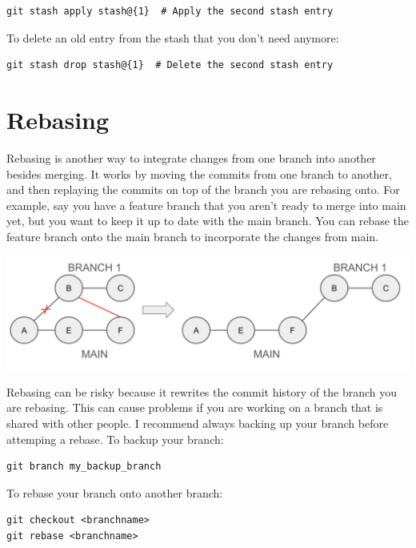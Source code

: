 \documentclass[fleqn]{article}
\begin{document}
\begin{lstlisting}
git stash apply stash@{1}  # Apply the second stash entry
\end{lstlisting}

To delete an old entry from the stash that you don't need anymore:

\begin{lstlisting}
git stash drop stash@{1}  # Delete the second stash entry
\end{lstlisting}

\pagebreak

\section*{Rebasing}

Rebasing is another way to integrate changes from one branch into another
besides merging. It works by moving the commits from one branch to another, and
then replaying the commits on top of the branch you are rebasing onto. For
example, say you have a feature branch that you aren't ready to merge into main
yet, but you want to keep it up to date with the main branch. You can rebase the
feature branch onto the main branch to incorporate the changes from main.

\begin{center}
    \includegraphics[scale=0.4]{rebase.png}
\end{center}

Rebasing can be risky because it rewrites the commit history of the branch you
are rebasing. This can cause problems if you are working on a branch that is
shared with other people. I recommend always backing up your branch before 
attemping a rebase. To backup your branch:

\begin{lstlisting}
git branch my_backup_branch
\end{lstlisting}

To rebase your branch onto another branch:

\begin{lstlisting}
git checkout <branchname>
git rebase <branchname>
\end{lstlisting}
\end{document}
